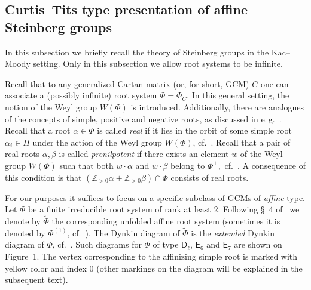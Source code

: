 \documentclass[oneside, 10pt]{amsart}
\newcommand{\rD}{\mathsf{D}}
\newcommand{\rE}{\mathsf{E}}
\numberwithin{equation}{section}
\numberwithin{thm}{section}
\numberwithin{lemma}{section}
\theoremstyle{definition}
\theoremstyle{remark}
\begin{document}
\subsection{Curtis--Tits type presentation of affine Steinberg groups} \label{subsec:curtis-tits}
In this subsection we briefly recall the theory of Steinberg groups in the Kac--Moody setting.
Only in this subsection we allow root systems to be infinite.

Recall that to any generalized Cartan matrix (or, for short, GCM) $C$ one can associate a (possibly infinite) root system $\Phi = \Phi_C$.
In this general setting, the notion of the Weyl group $W(\Phi)$ is introduced.
Additionally, there are analogues of the concepts of simple, positive and negative roots, as discussed in e.\,g.~\cite[\S~16]{Ca05}.
Recall that a root $\alpha \in \Phi$ is called \textit{real} if it lies in the orbit of some simple root $\alpha_i \in \Pi$ under the action of the Weyl group $W(\Phi)$, cf.~\cite[\S~16.3]{Ca05}.
Recall that a pair of real roots $\alpha, \beta$ is called \textit{prenilpotent} if there exists an element $w$ of the Weyl group $W(\Phi)$ such that both $w\cdot \alpha$ and $w \cdot \beta$ belong to $\Phi^+,$ cf.~\cite[\S~3]{A16}.
A consequence of this condition is that $(\mathbb{Z}_{>0} \alpha + \mathbb{Z}_{>0}\beta)\cap \Phi$ consists of real roots.

For our purposes it suffices to focus on a specific subclass of GCMs of \textit{affine} type.
Let $\Phi$ be a finite irreducible root system of rank at least $2$.
Following \S~4 of~\cite{A16} we denote by $\widetilde{\Phi}$ the corresponding unfolded affine root system (sometimes it is denoted by $\Phi^{(1)}$, cf.~\cite[Table~2]{A16}).
The Dynkin diagram of $\widetilde{\Phi}$ is the \textit{extended} Dynkin diagram of $\Phi$, cf.~\cite[\S~17.1]{Ca05}.
Such diagrams for $\Phi$ of type $\rD_\ell$, $\rE_6$ and $\rE_7$ are shown on Figure~1.
The vertex corresponding to the affinizing simple root is marked with yellow color and index $0$ (other markings on the diagram will be explained in the subsequent text).
\end{document}
